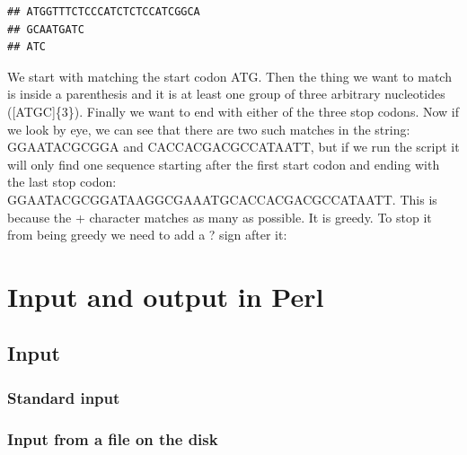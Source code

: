 \documentclass[]{book}
\makeatletter
\newenvironment{Shaded}{\begin{snugshade}}{\end{snugshade}}
\newcommand{\CharTok}[1]{\textcolor[rgb]{0.31,0.60,0.02}{#1}}
\newcommand{\DataTypeTok}[1]{\textcolor[rgb]{0.13,0.29,0.53}{#1}}
\newcommand{\FunctionTok}[1]{\textcolor[rgb]{0.00,0.00,0.00}{#1}}
\newcommand{\KeywordTok}[1]{\textcolor[rgb]{0.13,0.29,0.53}{\textbf{#1}}}
\newcommand{\NormalTok}[1]{#1}
\newcommand{\StringTok}[1]{\textcolor[rgb]{0.31,0.60,0.02}{#1}}
\newenvironment{kframe}{%
\medskip{}
\setlength{\fboxsep}{.8em}
 \def\at@end@of@kframe{}%
 \ifinner\ifhmode%
  \def\at@end@of@kframe{\end{minipage}}%
  \begin{minipage}{\columnwidth}%
 \fi\fi%
 \def\FrameCommand##1{\hskip\@totalleftmargin \hskip-\fboxsep
 \colorbox{shadecolor}{##1}\hskip-\fboxsep
     \hskip-\linewidth \hskip-\@totalleftmargin \hskip\columnwidth}%
 \MakeFramed {\advance\hsize-\width
   \@totalleftmargin\z@ \linewidth\hsize
   \@setminipage}}%
 {\par\unskip\endMakeFramed%
 \at@end@of@kframe}
\renewenvironment{Shaded}{\begin{kframe}}{\end{kframe}}
\makeatother
\begin{document}
\begin{verbatim}
## ATGGTTTCTCCCATCTCTCCATCGGCA
## GCAATGATC
## ATC
\end{verbatim}

We start with matching the start codon ATG. Then the thing we want to match
is inside a parenthesis and it is at least one group of three arbitrary nucleotides
({[}ATGC{]}\{3\}). Finally we want to end with either of the three stop codons. Now
if we look by eye, we can see that there are two such matches in the string:
GGAATACGCGGA and CACCACGACGCCATAATT, but if we run the script it will only find
one sequence starting after the first start codon and ending with the last stop codon:
GGAATACGCGGATAAGGCGAAATGCACCACGACGCCATAATT. This is because the + character
matches as many as possible. It is greedy. To stop it from being greedy we need
to add a ? sign after it:

\hypertarget{input-and-output-in-perl}{%
\chapter{Input and output in Perl}\label{input-and-output-in-perl}}

\hypertarget{input}{%
\section{Input}\label{input}}

\hypertarget{standard-input}{%
\subsection{Standard input}\label{standard-input}}

\hypertarget{input-from-a-file-on-the-disk}{%
\subsection{Input from a file on the disk}\label{input-from-a-file-on-the-disk}}

\begin{Shaded}
\end{Shaded}
\end{document}
